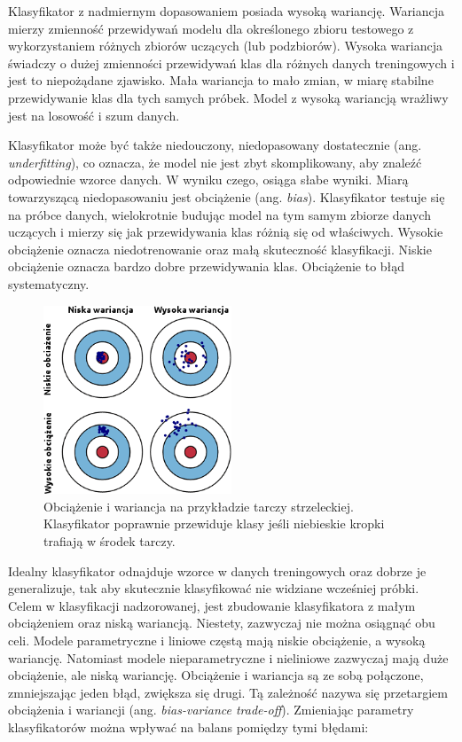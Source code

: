 Klasyfikator z nadmiernym dopasowaniem posiada wysoką wariancję. Wariancja mierzy zmienność przewidywań modelu dla określonego zbioru testowego z wykorzystaniem różnych zbiorów uczących (lub podzbiorów). Wysoka wariancja świadczy o dużej zmienności przewidywań klas dla różnych danych treningowych i jest to niepożądane zjawisko. Mała wariancja to mało zmian, w miarę stabilne przewidywanie klas dla tych samych próbek. Model z wysoką wariancją wrażliwy jest na losowość i szum danych. \par
Klasyfikator może być także niedouczony, niedopasowany dostatecznie (ang. \textit{underfitting}), co oznacza, że model nie jest zbyt skomplikowany, aby znaleźć odpowiednie wzorce danych. W wyniku czego, osiąga słabe wyniki. Miarą towarzyszącą niedopasowaniu jest obciążenie (ang. \textit{bias}). Klasyfikator testuje się na próbce danych, wielokrotnie budując model na tym samym zbiorze danych uczących i mierzy się jak przewidywania klas różnią się od właściwych. Wysokie obciążenie oznacza niedotrenowanie oraz małą skuteczność klasyfikacji. Niskie obciążenie oznacza bardzo dobre przewidywania klas. Obciążenie to błąd systematyczny. \par
\begin{figure}[H]
	\centering
	\includegraphics[width=0.5\textwidth]{./images/biasvariance.png}
	\caption{Obciążenie i wariancja na przykładzie tarczy strzeleckiej. Klasyfikator poprawnie przewiduje klasy jeśli niebieskie kropki trafiają w środek tarczy.}
	\label{fig:biasvariance}
\end{figure}
Idealny klasyfikator odnajduje wzorce w danych treningowych oraz dobrze je generalizuje, tak aby skutecznie klasyfikować nie widziane wcześniej próbki. Celem w klasyfikacji nadzorowanej, jest zbudowanie klasyfikatora z małym obciążeniem oraz niską wariancją. Niestety, zazwyczaj nie można osiągnąć obu celi. Modele parametryczne i liniowe częstą mają niskie obciążenie, a wysoką wariancję. Natomiast modele nieparametryczne i nieliniowe zazwyczaj mają duże obciążenie, ale niską wariancję. Obciążenie i wariancja są ze sobą połączone, zmniejszając jeden błąd, zwiększa się drugi. Tą zależność nazywa się przetargiem obciążenia i wariancji (ang. \textit{bias-variance trade-off}). Zmieniając parametry klasyfikatorów można wpływać na balans pomiędzy tymi błędami:
